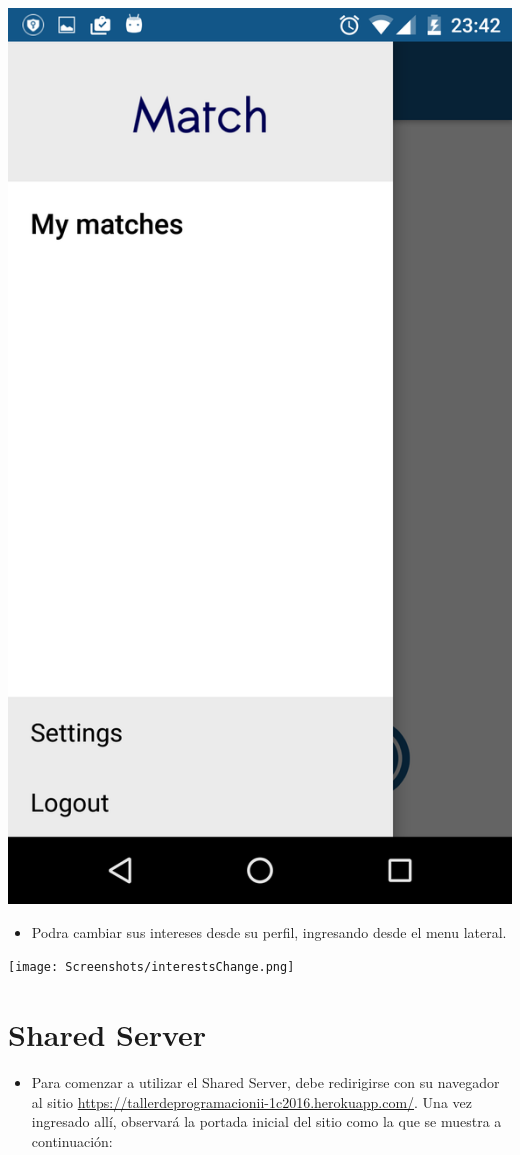 \documentclass[letterpaper,10pt,english]{sphinxmanual}
\begin{document}
\includegraphics{sidebar.png}
\begin{itemize}
\item {} 
Podra cambiar sus intereses desde su perfil, ingresando desde el menu lateral.

\end{itemize}

\texttt{[image: Screenshots/interestsChange.png]}


\section{Shared Server}
\label{manuals:shared-server}\begin{itemize}
\item {} 
Para comenzar a utilizar el Shared Server, debe redirigirse con su navegador al sitio \href{https://tallerdeprogramacionii-1c2016.herokuapp.com/}{https://tallerdeprogramacionii-1c2016.herokuapp.com/}. Una vez ingresado allí, observará la portada inicial del sitio como la que se muestra a continuación:

\end{itemize}
\end{document}
